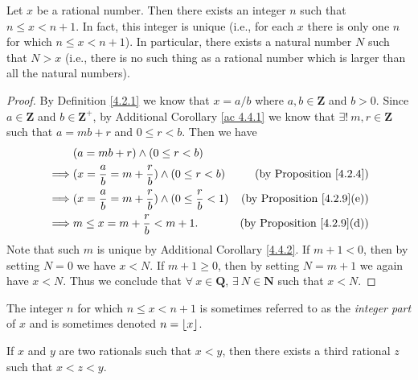 \begin{proposition}\label{4.4.1}
    Let \(x\) be a rational number.
    Then there exists an integer \(n\) such that \(n \leq x < n + 1\).
    In fact, this integer is unique (i.e., for each \(x\) there is only one \(n\) for which \(n \leq x < n + 1\)).
    In particular, there exists a natural number \(N\) such that \(N > x\)
    (i.e., there is no such thing as a rational number which is larger than all the natural numbers).
\end{proposition}

\begin{proof}
    By Definition \ref{4.2.1} we know that \(x = a / b\) where \(a, b \in \mathbf{Z}\) and \(b > 0\).
    Since \(a \in \mathbf{Z}\) and \(b \in \mathbf{Z}^+\), by Additional Corollary \ref{ac 4.4.1} we know that \(\exists!\ m, r \in \mathbf{Z}\) such that \(a = mb + r\) and \(0 \leq r < b\).
    Then we have
    \begin{align*}
                 & (a = mb + r) \land (0 \leq r < b)                                                                           \\
        \implies & (x = \frac{a}{b} = m + \frac{r}{b}) \land (0 \leq r < b)           & \text{(by Proposition \ref{4.2.4})}    \\
        \implies & (x = \frac{a}{b} = m + \frac{r}{b}) \land (0 \leq \frac{r}{b} < 1) & \text{(by Proposition \ref{4.2.9}(e))} \\
        \implies & m \leq x = m + \frac{r}{b} < m + 1.                                & \text{(by Proposition \ref{4.2.9}(d))}
    \end{align*}
    Note that such \(m\) is unique by Additional Corollary \ref{4.4.2}.
    If \(m + 1 < 0\), then by setting \(N = 0\) we have \(x < N\).
    If \(m + 1 \geq 0\), then by setting \(N = m + 1\) we again have \(x < N\).
    Thus we conclude that \(\forall\ x \in \mathbf{Q}\), \(\exists\ N \in \mathbf{N}\) such that \(x < N\).
\end{proof}

\begin{remark}\label{4.4.2}
    The integer \(n\) for which \(n \leq x < n + 1\) is sometimes referred to as the \emph{integer part} of \(x\) and is sometimes denoted \(n = \floor*{x}\).
\end{remark}

\begin{proposition}\label{4.4.3}
    If \(x\) and \(y\) are two rationals such that \(x < y\), then there exists a third rational \(z\) such that \(x < z < y\).
\end{proposition}

